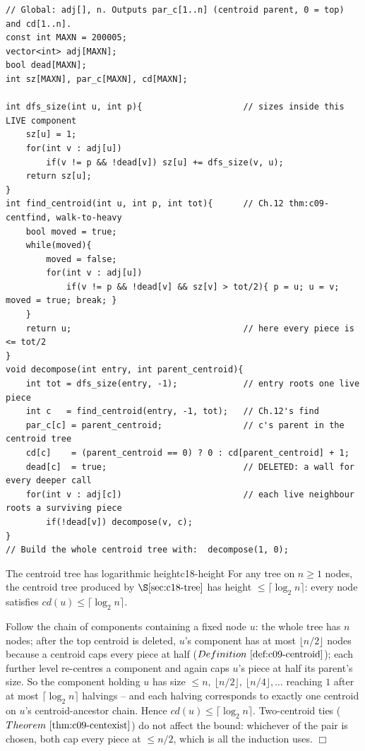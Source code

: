 \begin{lstlisting}[caption={The recursive centroid-tree build over a fixed tree. The centroid finder is Ch.12's walk-to-heavy (thm:c09-centfind) used as a black box; the dead[] marker keeps pieces out of already-claimed nodes. ASCII only}, label={lst:c18-build}]
// Global: adj[], n. Outputs par_c[1..n] (centroid parent, 0 = top) and cd[1..n].
const int MAXN = 200005;
vector<int> adj[MAXN];
bool dead[MAXN];
int sz[MAXN], par_c[MAXN], cd[MAXN];

int dfs_size(int u, int p){                    // sizes inside this LIVE component
    sz[u] = 1;
    for(int v : adj[u])
        if(v != p && !dead[v]) sz[u] += dfs_size(v, u);
    return sz[u];
}
int find_centroid(int u, int p, int tot){      // Ch.12 thm:c09-centfind, walk-to-heavy
    bool moved = true;
    while(moved){
        moved = false;
        for(int v : adj[u])
            if(v != p && !dead[v] && sz[v] > tot/2){ p = u; u = v; moved = true; break; }
    }
    return u;                                  // here every piece is <= tot/2
}
void decompose(int entry, int parent_centroid){
    int tot = dfs_size(entry, -1);             // entry roots one live piece
    int c   = find_centroid(entry, -1, tot);   // Ch.12's find
    par_c[c] = parent_centroid;                // c's parent in the centroid tree
    cd[c]    = (parent_centroid == 0) ? 0 : cd[parent_centroid] + 1;
    dead[c]  = true;                           // DELETED: a wall for every deeper call
    for(int v : adj[c])                        // each live neighbour roots a surviving piece
        if(!dead[v]) decompose(v, c);
}
// Build the whole centroid tree with:  decompose(1, 0);
\end{lstlisting}

\begin{theorem}{The centroid tree has logarithmic height}{c18-height}
For any tree on \(n\ge 1\) nodes, the centroid tree produced by
\(\secref{c18-tree}\) has height \(\le\lceil\log_2 n\rceil\): every node satisfies
\(\mathit{cd}(u)\le\lceil\log_2 n\rceil\).
\end{theorem}
\begin{proofbox}
Follow the chain of components containing a fixed node \(u\): the whole tree has
\(n\) nodes; after the top centroid is deleted, \(u\)'s component has at most
\(\lfloor n/2\rfloor\) nodes because a centroid caps every piece at half
(\(\defref{c09-centroid}\)); each further level re-centres a component and again
caps \(u\)'s piece at half its parent's size. So the component holding \(u\) has
size \(\le n,\ \lfloor n/2\rfloor,\ \lfloor n/4\rfloor,\dots\) reaching \(1\) after
at most \(\lceil\log_2 n\rceil\) halvings -- and each halving corresponds to
exactly one centroid on \(u\)'s centroid-ancestor chain. Hence
\(\mathit{cd}(u)\le\lceil\log_2 n\rceil\). Two-centroid ties (\(\thmref{c09-centexist}\))
do not affect the bound: whichever of the pair is chosen, both cap every piece at
\(\le n/2\), which is all the induction uses. \(\Box\)
\end{proofbox}

